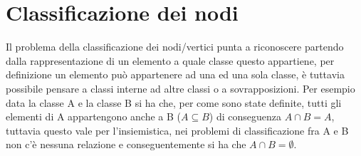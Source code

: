 \section{Classificazione dei nodi}
Il problema della classificazione dei nodi/vertici punta a riconoscere partendo dalla rappresentazione di un elemento a quale classe questo appartiene, per definizione un elemento può appartenere ad una ed una sola classe, è tuttavia possibile pensare a classi interne ad altre classi o a sovrapposizioni. Per esempio data la classe A e la classe B si ha che, per come sono state definite, tutti gli elementi di A appartengono anche a B ($\displaystyle A \subseteq B$) di conseguenza $\displaystyle A \cap B = A$, tuttavia questo vale per l'insiemistica, nei problemi di classificazione fra A e B non c'è nessuna relazione e conseguentemente si ha che $\displaystyle A \cap B = \emptyset$.%
%
